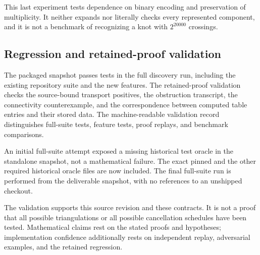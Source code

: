 This last experiment tests dependence on binary encoding and preservation
of multiplicity. It neither expands nor literally checks every represented
component, and it is not a benchmark of recognizing a knot with
$2^{20000}$ crossings.

\subsection{Regression and retained-proof validation}

The packaged snapshot passes \FullTestCount{} tests in the full
 discovery run, including the existing repository suite
and the new features. The retained-proof validation checks the
source-bound transport positives, the obstruction transcript, the
connectivity counterexample, and the correspondence between computed
table entries and their stored data. The machine-readable validation
record distinguishes full-suite tests, feature tests, proof replays, and
benchmark comparisons.

An initial full-suite attempt exposed a missing historical test oracle in
the standalone snapshot, not a mathematical failure. The exact pinned
 and the other required
historical oracle files are now included. The final full-suite run is
performed from the deliverable snapshot, with no references to an
unshipped checkout.

The validation supports this source revision and these contracts. It is
not a proof that all possible triangulations or all possible cancellation
schedules have been tested. Mathematical claims rest on the stated
proofs and hypotheses; implementation confidence additionally rests on
independent replay, adversarial examples, and the retained regression.
